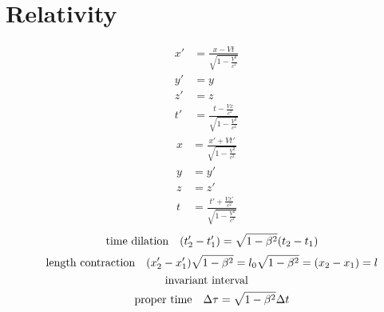 \documentclass[12pt]{article}
\begin{document}
\section*{Relativity}
\begin{align*}
x'&=\frac{x-Vt}{\sqrt{1-\frac{V^2}{c^2}}}\\
y'&=y\\
z'&=z\\
t'&=\frac{t-\frac{Vx}{c^2}}{\sqrt{1-\frac{V^2}{c^2}}}
\end{align*}
\begin{align*}
x&=\frac{x'+Vt'}{\sqrt{1-\frac{V^2}{c^2}}}\\
y&=y'\\
z&=z'\\
t&=\frac{t'+\frac{Vx'}{c^2}}{\sqrt{1-\frac{V^2}{c^2}}}
\end{align*}
\[\qq{time dilation}(t_2'-t_1')=\sqrt{1-\beta^2}(t_2-t_1)\]
\[\qq{length contraction}(x_2'-x_1')\sqrt{1-\beta^2}=l_0\sqrt{1-\beta^2}=(x_2-x_1)=l\]
\[\qq{invariant interval}\]
\[\qq{proper time}\Delta{\tau}=\sqrt{1-\beta^2}\Delta{t}\]
\end{document}
